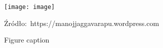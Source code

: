 
\begin{figure}
  \centering
  \texttt{[image: image]}
  \vspace{-5pt}
  \caption{\tiny Źródło:~https://manojjaggavarapu.wordpress.com}
\end{figure}

\begin{figure}[!h]
  \centering
  \vspace{-10pt}
  \caption{\tiny Figure caption}
\end{figure}

